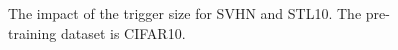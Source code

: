 \begin{figure}[!t]
	 \centering
{}
\caption{The impact of the trigger size for SVHN and STL10. The pre-training dataset is CIFAR10.}
\label{impact_of_trigger_size_cifar10}
\vspace{-2mm}
\end{figure}



